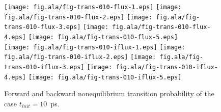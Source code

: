 \documentclass[aip,jcp,a4paper,preprint,onecolumn]{revtex4-1}
\begin{document}
\begin{figure}
  \centering
  \texttt{[image: fig.ala/fig-trans-010-flux-1.eps]}
  \texttt{[image: fig.ala/fig-trans-010-flux-2.eps]}
  \texttt{[image: fig.ala/fig-trans-010-flux-3.eps]}
  \texttt{[image: fig.ala/fig-trans-010-flux-4.eps]}
  \texttt{[image: fig.ala/fig-trans-010-flux-5.eps]}\\
  \texttt{[image: fig.ala/fig-trans-010-iflux-1.eps]}
  \texttt{[image: fig.ala/fig-trans-010-iflux-2.eps]}
  \texttt{[image: fig.ala/fig-trans-010-iflux-3.eps]}
  \texttt{[image: fig.ala/fig-trans-010-iflux-4.eps]}
  \texttt{[image: fig.ala/fig-trans-010-iflux-5.eps]}
  \caption{Forward and backward nonequilibrium transition probability of the case $t_{init} = 10$~ps.}
  \label{fig:tmp6}
\end{figure}
\end{document}
